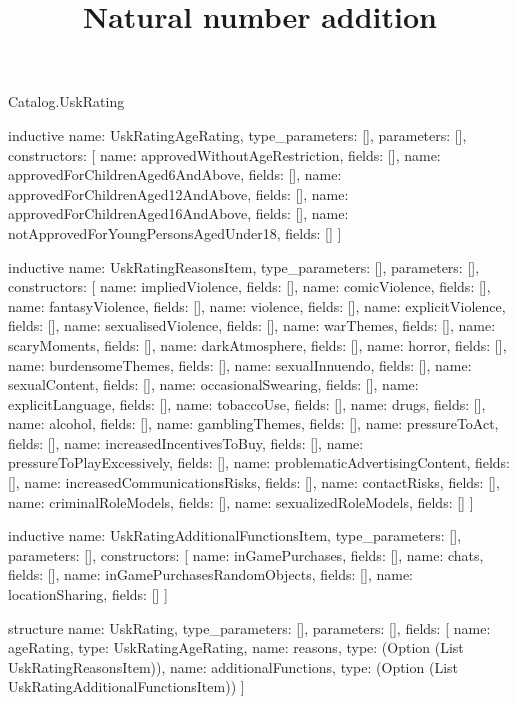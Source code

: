 \begin{lexlean}{Catalog.UskRating}
\title{Natural number addition}
\begin{semanticmodule}
inductive{
  name: UskRatingAgeRating,
  type_parameters: [],
  parameters: [],
  constructors: [
    {name: approvedWithoutAgeRestriction, fields: []},
    {name: approvedForChildrenAged6AndAbove, fields: []},
    {name: approvedForChildrenAged12AndAbove, fields: []},
    {name: approvedForChildrenAged16AndAbove, fields: []},
    {name: notApprovedForYoungPersonsAgedUnder18, fields: []}
  ]
}

inductive{
  name: UskRatingReasonsItem,
  type_parameters: [],
  parameters: [],
  constructors: [
    {name: impliedViolence, fields: []},
    {name: comicViolence, fields: []},
    {name: fantasyViolence, fields: []},
    {name: violence, fields: []},
    {name: explicitViolence, fields: []},
    {name: sexualisedViolence, fields: []},
    {name: warThemes, fields: []},
    {name: scaryMoments, fields: []},
    {name: darkAtmosphere, fields: []},
    {name: horror, fields: []},
    {name: burdensomeThemes, fields: []},
    {name: sexualInnuendo, fields: []},
    {name: sexualContent, fields: []},
    {name: occasionalSwearing, fields: []},
    {name: explicitLanguage, fields: []},
    {name: tobaccoUse, fields: []},
    {name: drugs, fields: []},
    {name: alcohol, fields: []},
    {name: gamblingThemes, fields: []},
    {name: pressureToAct, fields: []},
    {name: increasedIncentivesToBuy, fields: []},
    {name: pressureToPlayExcessively, fields: []},
    {name: problematicAdvertisingContent, fields: []},
    {name: increasedCommunicationsRisks, fields: []},
    {name: contactRisks, fields: []},
    {name: criminalRoleModels, fields: []},
    {name: sexualizedRoleModels, fields: []}
  ]
}

inductive{
  name: UskRatingAdditionalFunctionsItem,
  type_parameters: [],
  parameters: [],
  constructors: [
    {name: inGamePurchases, fields: []},
    {name: chats, fields: []},
    {name: inGamePurchasesRandomObjects, fields: []},
    {name: locationSharing, fields: []}
  ]
}

structure{
  name: UskRating,
  type_parameters: [],
  parameters: [],
  fields: [
    {name: ageRating, type: UskRatingAgeRating},
    {name: reasons, type: (Option (List UskRatingReasonsItem))},
    {name: additionalFunctions, type: (Option (List UskRatingAdditionalFunctionsItem))}
  ]
}
\end{semanticmodule}
\end{lexlean}
